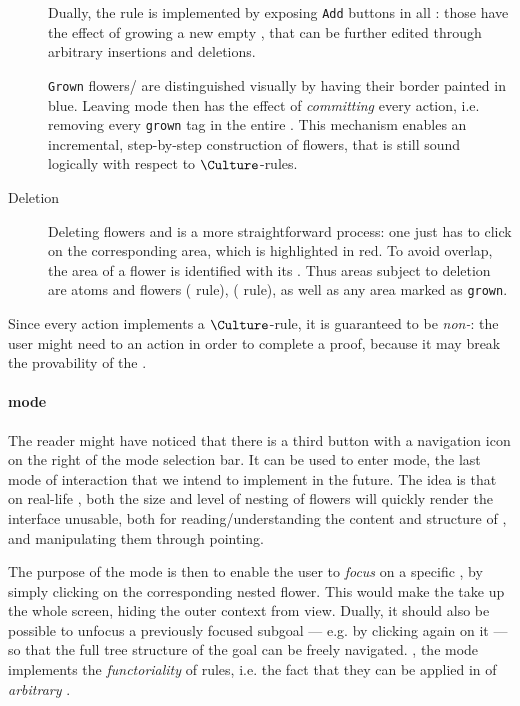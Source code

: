 \begin{scope}
\begin{description}
  Dually, the  rule is implemented by exposing \texttt{Add} buttons in
  all  : those have the effect of growing a new empty ,
  that can be further edited through arbitrary insertions and deletions.

  \texttt{Grown} flowers/ are distinguished visually by having their
  border painted in blue. Leaving  mode then has the effect of
  \emph{committing} every  action, i.e. removing every \texttt{grown}
  tag in the entire . This mechanism enables an incremental,
  step-by-step construction of flowers, that is still sound logically with
  respect to $\Culture$-rules.

  \item[Deletion] Deleting flowers and  is a more straightforward
  process: one just has to click on the corresponding area, which is highlighted
  in red. To avoid overlap, the area of a flower is identified with its
  . Thus areas subject to deletion are  atoms and
  flowers ( rule),   ( rule), as well
  as any area marked as \texttt{grown}.
\end{description}

Since every  action implements a $\Culture$-rule, it is guaranteed to be
\emph{non-}: the user might need to  an  action in order to
complete a proof, because it may break the provability of the .

\paragraph{ mode}

The reader might have noticed that there is a third button with a navigation
icon on the right of the mode selection bar. It can be used to enter
 mode, the last mode of interaction that we intend to implement
in the future. The idea is that on real-life , both the size and level
of nesting of flowers will quickly render the interface unusable, both for
reading/understanding the content and structure of , and manipulating
them through pointing.

The purpose of the  mode is then to enable the user to
\emph{focus} on a specific , by simply clicking on the corresponding
nested flower. This would make the  take up the whole screen, hiding
the outer context from view. Dually, it should also be possible to unfocus a
previously focused subgoal --- e.g. by clicking again on it --- so that the full
tree structure of the goal can be freely navigated. ,
the  mode implements the \emph{functoriality} of rules, i.e. the
fact that they can be applied in  of \emph{arbitrary} .


\end{scope}
